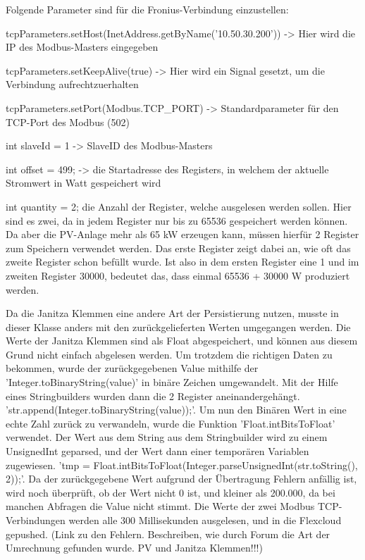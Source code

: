 Folgende Parameter sind für die Fronius-Verbindung einzustellen:

\begin{compactitem}
  \item tcpParameters.setHost(InetAddress.getByName('10.50.30.200')) -> Hier wird die IP des Modbus-Masters eingegeben
  \item tcpParameters.setKeepAlive(true) -> Hier wird ein Signal gesetzt, um die Verbindung aufrechtzuerhalten
  \item tcpParameters.setPort(Modbus.TCP\_PORT) -> Standardparameter für den TCP-Port des Modbus (502)
  \item int slaveId = 1 -> SlaveID des Modbus-Masters
  \item int offset = 499; -> die Startadresse des Registers, in welchem der aktuelle Stromwert in Watt gespeichert wird
  \item int quantity = 2; die Anzahl der Register, welche ausgelesen werden sollen. Hier sind es zwei, da in jedem Register nur bis zu 65536 gespeichert werden können. Da aber die PV-Anlage mehr als 65 kW erzeugen kann, müssen hierfür 2 Register zum Speichern verwendet werden. Das erste Register zeigt dabei an, wie oft das zweite Register schon befüllt wurde. Ist also in dem ersten Register eine 1 und im zweiten Register 30000, bedeutet das, dass einmal 65536 + 30000 W produziert werden.
\end{compactitem}

Da die Janitza Klemmen eine andere Art der Persistierung nutzen, musste in dieser Klasse anders mit den zurückgelieferten Werten umgegangen werden. Die Werte der Janitza Klemmen sind als Float abgespeichert, und können aus diesem Grund nicht einfach abgelesen werden. Um trotzdem die richtigen Daten zu bekommen, wurde der zurückgegebenen Value mithilfe der 'Integer.toBinaryString(value)' in binäre Zeichen umgewandelt. Mit der Hilfe eines Stringbuilders wurden dann die 2 Register aneinandergehängt. 'str.append(Integer.toBinaryString(value));'. Um nun den Binären Wert in eine echte Zahl zurück zu verwandeln, wurde die Funktion 'Float.intBitsToFloat' verwendet. Der Wert aus dem String aus dem Stringbuilder wird zu einem UnsignedInt geparsed, und der Wert dann einer temporären Variablen zugewiesen. 'tmp = Float.intBitsToFloat(Integer.parseUnsignedInt(str.toString(), 2));'. Da der zurückgegebene Wert aufgrund der Übertragung Fehlern anfällig ist, wird noch überprüft, ob der Wert nicht 0 ist, und kleiner als 200.000, da bei manchen Abfragen die Value nicht stimmt. Die Werte der zwei Modbus TCP-Verbindungen werden alle 300 Millisekunden ausgelesen, und in die Flexcloud gepushed.
(Link zu den Fehlern. Beschreiben, wie durch Forum die Art der Umrechnung gefunden wurde. PV und Janitza Klemmen!!!)

